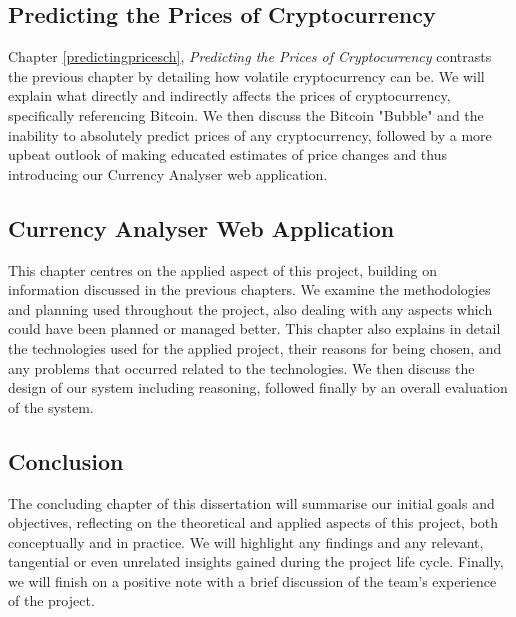 \subsection{Predicting the Prices of Cryptocurrency}
Chapter \ref{predictingpricesch}, \textit{Predicting the Prices of Cryptocurrency} contrasts the previous chapter by detailing how volatile cryptocurrency can be. We will explain what directly and indirectly affects the prices of cryptocurrency, specifically referencing Bitcoin. We then discuss the Bitcoin "Bubble" and the inability to absolutely predict prices of any cryptocurrency, followed by a more upbeat outlook of making educated estimates of price changes and thus introducing our Currency Analyser web application.

\subsection{Currency Analyser Web Application}
This chapter centres on the applied aspect of this project, building on information discussed in the previous chapters. We examine the methodologies and planning used throughout the project, also dealing with any aspects which could have been planned or managed better. This chapter also explains in detail the technologies used for the applied project, their reasons for being chosen, and any problems that occurred related to the technologies. We then discuss the design of our system including reasoning, followed finally by an overall evaluation of the system. 

\subsection{Conclusion}
The concluding chapter of this dissertation will summarise our initial goals and objectives, reflecting on the theoretical and applied aspects of this project, both conceptually and in practice. We will highlight any findings and any relevant, tangential or even unrelated insights gained during the project life cycle. Finally, we will finish on a positive note with a brief discussion of the team's experience of the project.